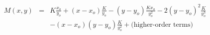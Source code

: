 

\[
\begin{array}{lcl} M(x,y) & = & K\frac{x_o}{y_o} + (x - x_o)\frac{K}{y_o} - (y - y_o)\frac{Kx_o}{y_{o}^2} - 2(y-y_o)^2\frac{K}{y_{o}^3} \\ & & - (x - x_o)(y - y_o)\frac{K}{y_{o}^2} + \mbox{(higher-order terms)} \end{array}
\]


